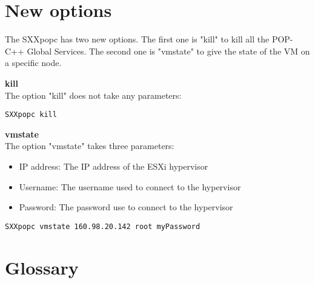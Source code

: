 \documentclass[a4paper, 11pt]{article}
\newcommand{\s}{\vspace{0.3cm}}
\begin{document}





\section{New options}
The SXXpopc has two new options. The first one is "kill" to kill all the POP-C++ Global Services. The second one is "vmstate" to give the state of the VM on a specific node. \s

\textbf{kill}\\
The option "kill" does not take any parameters:
\begin{lstlisting}
SXXpopc kill
\end{lstlisting}\s

\textbf{vmstate}\\
The option "vmstate" takes three parameters: 
\begin{itemize}
\item IP address: The IP address of the ESXi hypervisor
\item Username: The username used to connect to the hypervisor
\item Password: The password use to connect to the hypervisor
\end{itemize}

\begin{lstlisting}
SXXpopc vmstate 160.98.20.142 root myPassword
\end{lstlisting}



\pagebreak
\section{Glossary}
\end{document}
